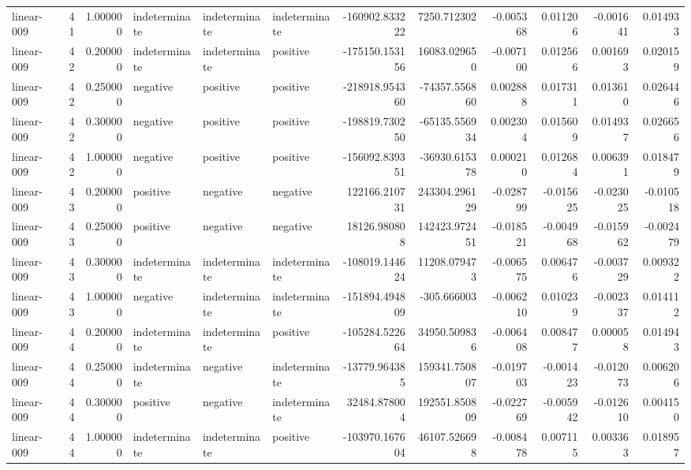 \begin{tabular}{lrrlllrrrrrr}
linear-009 & 41 & 1.000000 & indeterminate & indeterminate & indeterminate & -160902.833222 & 7250.712302 & -0.005368 & 0.011206 & -0.001641 & 0.014933 \\
linear-009 & 42 & 0.200000 & indeterminate & indeterminate & positive & -175150.153156 & 16083.029650 & -0.007100 & 0.012566 & 0.001693 & 0.020159 \\
linear-009 & 42 & 0.250000 & negative & positive & positive & -218918.954360 & -74357.556860 & 0.002888 & 0.017311 & 0.013610 & 0.026446 \\
linear-009 & 42 & 0.300000 & negative & positive & positive & -198819.730250 & -65135.556934 & 0.002304 & 0.015609 & 0.014937 & 0.026656 \\
linear-009 & 42 & 1.000000 & negative & positive & positive & -156092.839351 & -36930.615378 & 0.000210 & 0.012684 & 0.006391 & 0.018479 \\
linear-009 & 43 & 0.200000 & positive & negative & negative & 122166.210731 & 243304.296129 & -0.028799 & -0.015625 & -0.023025 & -0.010518 \\
linear-009 & 43 & 0.250000 & positive & negative & negative & 18126.980808 & 142423.972451 & -0.018521 & -0.004968 & -0.015962 & -0.002479 \\
linear-009 & 43 & 0.300000 & indeterminate & indeterminate & indeterminate & -108019.144624 & 11208.079473 & -0.006575 & 0.006476 & -0.003729 & 0.009322 \\
linear-009 & 43 & 1.000000 & negative & indeterminate & indeterminate & -151894.494809 & -305.666003 & -0.006210 & 0.010239 & -0.002337 & 0.014112 \\
linear-009 & 44 & 0.200000 & indeterminate & indeterminate & positive & -105284.522664 & 34950.509836 & -0.006408 & 0.008477 & 0.000058 & 0.014943 \\
linear-009 & 44 & 0.250000 & indeterminate & negative & indeterminate & -13779.964385 & 159341.750807 & -0.019703 & -0.001423 & -0.012073 & 0.006206 \\
linear-009 & 44 & 0.300000 & positive & negative & indeterminate & 32484.878004 & 192551.850809 & -0.022769 & -0.005942 & -0.012610 & 0.004150 \\
linear-009 & 44 & 1.000000 & indeterminate & indeterminate & positive & -103970.167604 & 46107.526698 & -0.008478 & 0.007115 & 0.003363 & 0.018957 \\
\bottomrule
\end{tabular}
